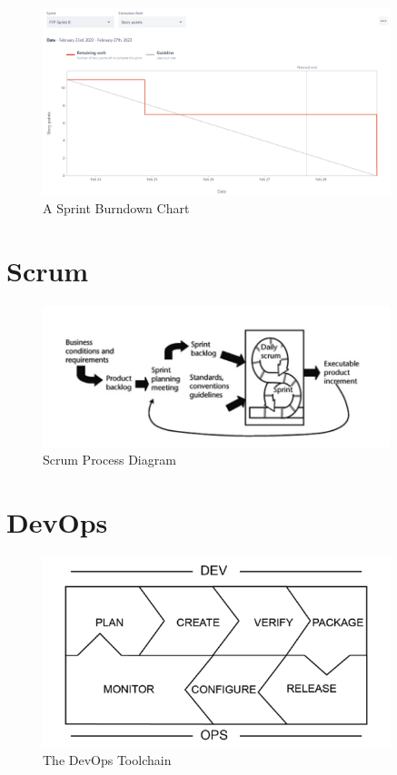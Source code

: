 \begin{figure}[h!]
    \centering
    \includegraphics[width=0.9\textwidth]{images/sprint-burndown.png}
    \caption{A Sprint Burndown Chart}
    \label{image:sprint-burndown}
\end{figure}

\chapter{Scrum}\label{appendix:scrum}
\begin{figure}[h!]
    \centering
    \includegraphics[width=0.9\textwidth]{images/scrum.png}
    \caption{Scrum Process Diagram}
    \label{image:scrum}
\end{figure}

\chapter{DevOps}\label{appendix:devops}
\begin{figure}[h!]
    \centering
    \includegraphics[width=0.9\textwidth]{images/devops.png}
    \caption{The DevOps Toolchain}
    \label{image:devops}
\end{figure}

